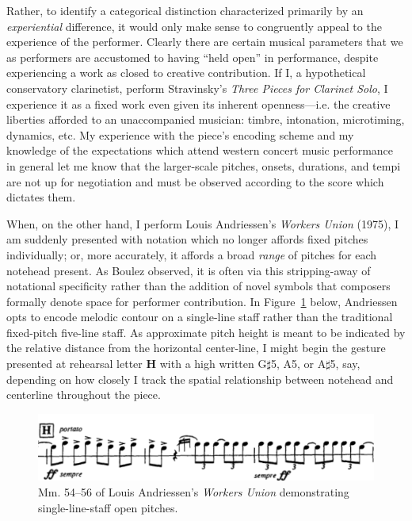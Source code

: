     Rather, to identify a categorical distinction characterized primarily by an \textit{experiential} difference, it would only make sense to congruently appeal to the experience of the performer. Clearly there are certain musical parameters that we as performers are accustomed to having ``held open'' in performance, despite experiencing a work as closed to creative contribution. If I, a hypothetical conservatory clarinetist, perform Stravinsky's \textit{Three Pieces for Clarinet Solo}, I experience it as a fixed work even given its inherent openness---i.e. the creative liberties afforded to an unaccompanied musician: timbre, intonation, microtiming, dynamics, etc. My experience with the piece's encoding scheme and my knowledge of the expectations which attend western concert music performance in general let me know that the larger-scale pitches, onsets, durations, and tempi are not up for negotiation and must be observed according to the score which dictates them. 
    
    When, on the other hand, I perform Louis Andriessen's \textit{Workers Union} (1975), I am suddenly presented with notation which no longer affords fixed pitches individually; or, more accurately, it affords a broad \textit{range} of pitches for each notehead present. As Boulez observed, it is often via this stripping-away of notational specificity rather than the addition of novel symbols that composers formally denote space for performer contribution. In Figure~\ref{fig:workersunion} below, Andriessen opts to encode melodic contour on a single-line staff rather than the traditional fixed-pitch five-line staff. As approximate pitch height is meant to be indicated by the relative distance from the horizontal center-line, I might begin the gesture presented at rehearsal letter \textbf{H} with a high written G$\sharp$5, A5, or A$\sharp$5, say, depending on how closely I track the spatial relationship between notehead and centerline throughout the piece.

            \begin{figure} 
            \centering
            \includegraphics[width=.9\textwidth]{images/chapter2/workers_union.png}
            \captionsetup{width=.5\textwidth}
            \caption[Mm. 54--56 of Louis Andriessen's \textit{Workers Union} featuring single-line-staff notation denoting open pitches.]{Mm. 54--56 of Louis Andriessen's \textit{Workers Union} demonstrating single-line-staff open pitches.\footnotemark}
            \label{fig:workersunion}
        \end{figure}
        
